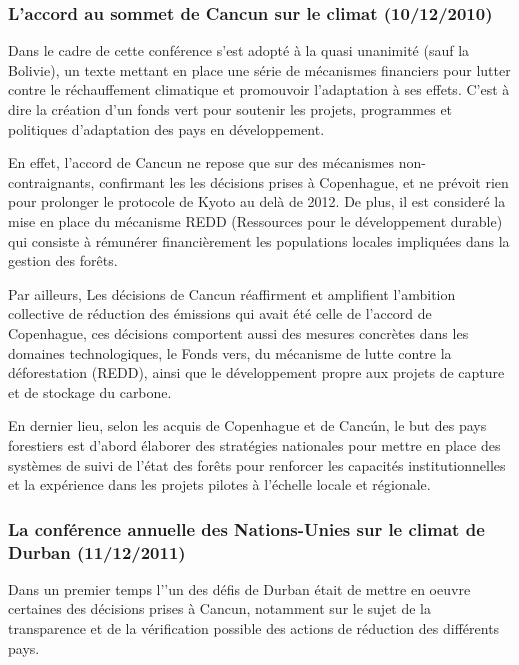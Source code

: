 \documentclass[a4paper,11pt]{article}
\begin{document}
\subsubsection[L’accord au sommet de Cancun sur le climat]{L’accord au sommet de Cancun sur le climat (10/12/2010)}

Dans le  cadre de cette  conférence s’est adopté  à la quasi unanimité  (sauf la
Bolivie),  un texte mettant  en place  une série  de mécanismes  financiers pour
lutter  contre le  réchauffement  climatique et  promouvoir  l'adaptation à  ses
effets. C’est  à dire  la création  d’un fonds vert  pour soutenir  les projets,
programmes et politiques d'adaptation des pays en développement. 


En effet, l'accord de Cancun ne repose que sur des mécanismes non-contraignants,
confirmant  les les  décisions  prises à  Copenhague,  et ne  prévoit rien  pour
prolonger le protocole  de Kyoto au delà  de 2012. De plus, il  est consideré la
mise en place  du mécanisme REDD (Ressources pour  le développement durable) qui
consiste à  rémunérer financièrement les populations locales  impliquées dans la
gestion des forêts. 


Par  ailleurs, Les  décisions  de Cancun  réaffirment  et amplifient  l’ambition
collective  de  réduction des  émissions  qui avait  été  celle  de l’accord  de
Copenhague,  ces  décisions comportent  aussi  des  mesures  concrètes dans  les
domaines  technologiques,  le  Fonds  vers,  du mécanisme  de  lutte  contre  la
déforestation (REDD), ainsi  que le développement propre aux  projets de capture
et de stockage du carbone.


En dernier lieu,  selon les acquis de  Copenhague et de Cancún, le  but des pays
forestiers est d’abord  élaborer des stratégies nationales pour  mettre en place
des  systèmes  de  suivi de  l’état  des  forêts  pour renforcer  les  capacités
institutionnelles et la  expérience dans les projets pilotes  à l’échelle locale
et régionale.


\subsubsection[La conférence annuelle des Nations-Unies sur le climat de Durban]{La conférence annuelle des Nations-Unies sur le climat de Durban (11/12/2011)}

Dans  un premier  temps l’'un  des défis  de Durban  était de  mettre  en oeuvre
certaines  des  décisions  prises  à  Cancun,  notamment  sur  le  sujet  de  la
transparence  et  de la  vérification  possible  des  actions de  réduction  des
différents pays. 
\end{document}
